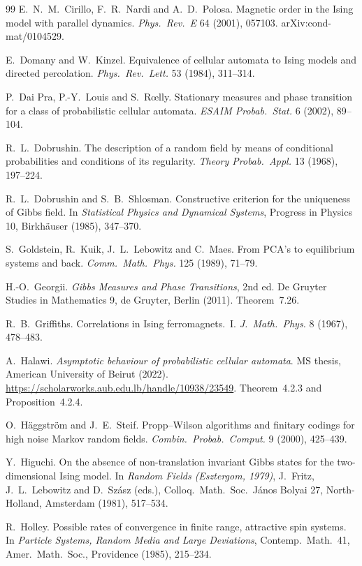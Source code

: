\documentclass[11pt]{article}
\theoremstyle{plain}
\theoremstyle{definition}
\theoremstyle{remark}
\begin{document}
\begin{thebibliography}{99}
 E.~N.~M.~Cirillo, F.~R.~Nardi and A.~D.~Polosa. Magnetic order in the Ising model with parallel dynamics. \emph{Phys.\ Rev.\ E} 64 (2001), 057103. arXiv:cond-mat/0104529.

 E.~Domany and W.~Kinzel. Equivalence of cellular automata to Ising models and directed percolation. \emph{Phys.\ Rev.\ Lett.} 53 (1984), 311--314.

 P.~Dai Pra, P.-Y.~Louis and S.~R\oe lly. Stationary measures and phase transition for a class of probabilistic cellular automata. \emph{ESAIM Probab.\ Stat.} 6 (2002), 89--104.

 R.~L.~Dobrushin. The description of a random field by means of conditional probabilities and conditions of its regularity. \emph{Theory Probab.\ Appl.} 13 (1968), 197--224.

 R.~L.~Dobrushin and S.~B.~Shlosman. Constructive criterion for the uniqueness of Gibbs field. In \emph{Statistical Physics and Dynamical Systems}, Progress in Physics 10, Birkh\"auser (1985), 347--370.

 S.~Goldstein, R.~Kuik, J.~L.~Lebowitz and C.~Maes. From PCA's to equilibrium systems and back. \emph{Comm.\ Math.\ Phys.} 125 (1989), 71--79.

 H.-O.~Georgii. \emph{Gibbs Measures and Phase Transitions}, 2nd ed. De Gruyter Studies in Mathematics 9, de Gruyter, Berlin (2011). Theorem~7.26.

 R.~B.~Griffiths. Correlations in Ising ferromagnets.~I. \emph{J.\ Math.\ Phys.} 8 (1967), 478--483.

 A.~Halawi. \emph{Asymptotic behaviour of probabilistic cellular automata}. MS thesis, American University of Beirut (2022). \url{https://scholarworks.aub.edu.lb/handle/10938/23549}. Theorem~4.2.3 and Proposition~4.2.4.

 O.~H\"aggstr\"om and J.~E.~Steif. Propp--Wilson algorithms and finitary codings for high noise Markov random fields. \emph{Combin.\ Probab.\ Comput.} 9 (2000), 425--439.

 Y.~Higuchi. On the absence of non-translation invariant Gibbs states for the two-dimensional Ising model. In \emph{Random Fields (Esztergom, 1979)}, J.~Fritz, J.~L.~Lebowitz and D.~Sz\'asz (eds.), Colloq.\ Math.\ Soc.\ J\'anos Bolyai 27, North-Holland, Amsterdam (1981), 517--534.

 R.~Holley. Possible rates of convergence in finite range, attractive spin systems. In \emph{Particle Systems, Random Media and Large Deviations}, Contemp.\ Math.\ 41, Amer.\ Math.\ Soc., Providence (1985), 215--234.


\end{thebibliography}
\end{document}
